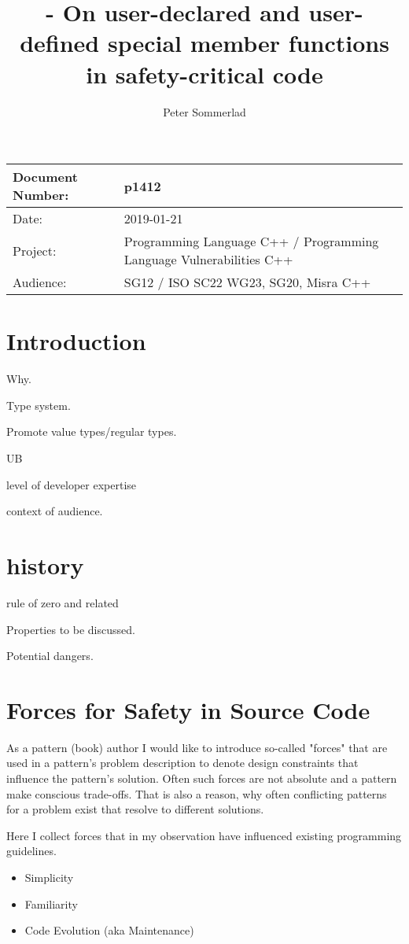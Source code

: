 \documentclass[ebook,11pt,article]{memoir}
\title{\papernumber{} - On user-declared and user-defined special member functions in safety-critical code}
\author{Peter Sommerlad}
\date{\paperdate}                %
\newcommand{\papernumber}{p1412}
\newcommand{\paperdate}{2019-01-21}
\begin{document}
\maketitle
\begin{center}
\begin{tabular}[t]{|l|l|}\hline 
Document Number:&  \papernumber \\\hline
Date: & \paperdate \\\hline
Project: & Programming Language C++ / Programming Language Vulnerabilities C++\\\hline 
Audience: & SG12 / ISO SC22 WG23, SG20, Misra C++\\\hline
\end{tabular}
\end{center}
\chapter{Introduction}

Why.

Type system.

Promote value types/regular types.

UB


level of developer expertise

context of audience.

\chapter{history}

rule of zero and related



Properties to be discussed. 

Potential dangers.

\chapter{Forces for Safety in Source Code}
As a pattern (book) author I would like to introduce so-called "forces" that are used in a pattern's problem description to denote design constraints that influence the pattern's solution. Often such forces are not absolute and a pattern make conscious trade-offs. That is also a reason, why often conflicting patterns for a problem exist that resolve to different solutions.

Here I collect forces that in my observation have influenced existing programming guidelines.
\begin{itemize}
\item Simplicity
\item Familiarity
\item Code Evolution (aka Maintenance)
\end{itemize}
\end{document}

